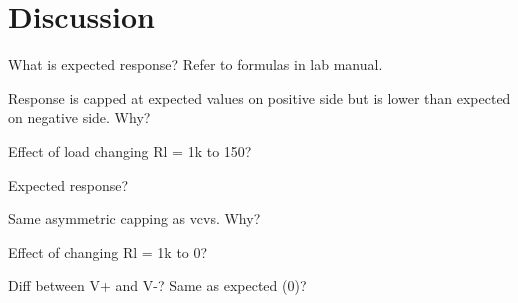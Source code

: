 \section{Discussion}\label{sec:discussion}
What is expected response? Refer to formulas in lab manual.

Response is capped at expected values on positive side but is lower than expected on negative side. Why?

Effect of load changing Rl = 1k to 150?

Expected response?

Same asymmetric capping as vcvs. Why?

Effect of changing Rl = 1k to 0?

Diff between  V+ and V-? Same as expected (0)?
